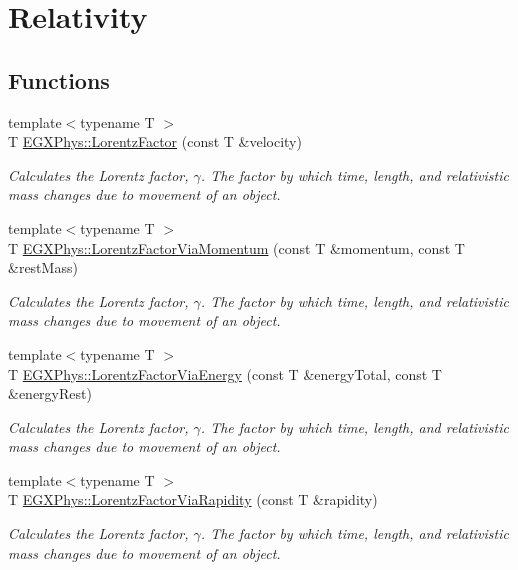 \hypertarget{group___relativity}{}\section{Relativity}
\label{group___relativity}
\subsection*{Functions}
\begin{DoxyCompactItemize}
\item 
{\footnotesize template$<$typename T $>$ }\\T \mbox{\hyperlink{group___relativity_ga5f9b11c1f4c3ae26a7e64f02c22d5a75}{E\+G\+X\+Phys\+::\+Lorentz\+Factor}} (const T \&velocity)
\begin{DoxyCompactList}\small\item\em Calculates the Lorentz factor, $\gamma$. The factor by which time, length, and relativistic mass changes due to movement of an object. \end{DoxyCompactList}\item 
{\footnotesize template$<$typename T $>$ }\\T \mbox{\hyperlink{group___relativity_ga1ea24128654ac333dd843afdd5c003b7}{E\+G\+X\+Phys\+::\+Lorentz\+Factor\+Via\+Momentum}} (const T \&momentum, const T \&rest\+Mass)
\begin{DoxyCompactList}\small\item\em Calculates the Lorentz factor, $\gamma$. The factor by which time, length, and relativistic mass changes due to movement of an object. \end{DoxyCompactList}\item 
{\footnotesize template$<$typename T $>$ }\\T \mbox{\hyperlink{group___relativity_ga601de8c039be89a9abea22bc459436c9}{E\+G\+X\+Phys\+::\+Lorentz\+Factor\+Via\+Energy}} (const T \&energy\+Total, const T \&energy\+Rest)
\begin{DoxyCompactList}\small\item\em Calculates the Lorentz factor, $\gamma$. The factor by which time, length, and relativistic mass changes due to movement of an object. \end{DoxyCompactList}\item 
{\footnotesize template$<$typename T $>$ }\\T \mbox{\hyperlink{group___relativity_ga8064f5bce1d2ca5f7bc39d95ba4d2dd9}{E\+G\+X\+Phys\+::\+Lorentz\+Factor\+Via\+Rapidity}} (const T \&rapidity)
\begin{DoxyCompactList}\small\item\em Calculates the Lorentz factor, $\gamma$. The factor by which time, length, and relativistic mass changes due to movement of an object. \end{DoxyCompactList}\end{DoxyCompactItemize}


